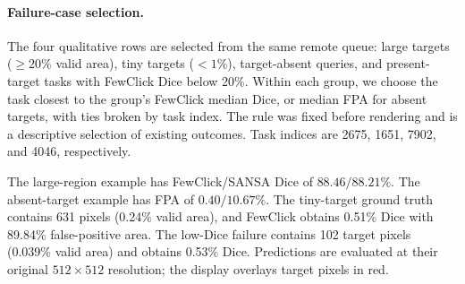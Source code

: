 \paragraph{Failure-case selection.}
The four qualitative rows are selected from the same remote queue: large targets ($\geq20\%$ valid area), tiny targets ($<1\%$), target-absent queries, and present-target tasks with FewClick Dice below 20\%. Within each group, we choose the task closest to the group's FewClick median Dice, or median FPA for absent targets, with ties broken by task index. The rule was fixed before rendering and is a descriptive selection of existing outcomes. Task indices are 2675, 1651, 7902, and 4046, respectively.

The large-region example has FewClick/SANSA Dice of $88.46/88.21\%$. The absent-target example has FPA of $0.40/10.67\%$. The tiny-target ground truth contains 631 pixels (0.24\% valid area), and FewClick obtains 0.51\% Dice with 89.84\% false-positive area. The low-Dice failure contains 102 target pixels (0.039\% valid area) and obtains 0.53\% Dice. Predictions are evaluated at their original $512\times512$ resolution; the display overlays target pixels in red.
